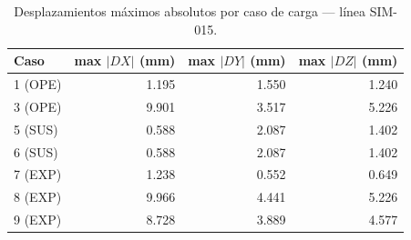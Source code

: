 \begin{table}[htbp]
  \centering
  \small
  \caption{Desplazamientos máximos absolutos por caso de carga — línea SIM-015.}
  \label{tab:desplaz-max}
  \begin{tabular}{lrrr}
    \toprule
    Caso & max $|DX|$ (\si{mm}) & max $|DY|$ (\si{mm}) & max $|DZ|$ (\si{mm}) \\
    \midrule
    1 (OPE) & 1.195 & 1.550 & 1.240 \\
    3 (OPE) & 9.901 & 3.517 & 5.226 \\
    5 (SUS) & 0.588 & 2.087 & 1.402 \\
    6 (SUS) & 0.588 & 2.087 & 1.402 \\
    7 (EXP) & 1.238 & 0.552 & 0.649 \\
    8 (EXP) & 9.966 & 4.441 & 5.226 \\
    9 (EXP) & 8.728 & 3.889 & 4.577 \\
    \bottomrule
  \end{tabular}
\end{table}

